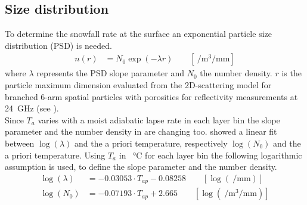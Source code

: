 \subsection{Size distribution} \label{sec:size_dist}
To determine the snowfall rate at the surface an exponential particle size distribution (PSD) is needed. 
\begin{align}
n(r) & = N_{0} \exp\left(-\lambda r\right) \qquad [ \SI{}{\per\cubic\metre\per\mm} ] \label{eq:num_dens}
\end{align}
where $\lambda$ represents the PSD slope parameter and $N_{0}$ the number density. $r$ is the particle maximum dimension evaluated from the 2D-scattering model for branched 6-arm spatial particles with porosities for reflectivity measurements at \SI{24}{\giga\Hz} (see ).
\\
Since $T_{a}$ varies with a moist adiabatic lapse rate in each layer bin the slope parameter and the number density in  are changing too. \cite{wood_estimation_2011} showed a linear fit between $\log(\lambda)$ and the a priori temperature, respectively $\log(N_0)$ and the a priori temperature.
Using $T_{a}$ in \SI{}{\celsius} for each layer bin the following logarithmic assumption is used, to define the slope parameter and the number density.
\begin{align}
\log(\lambda) & = -0.03053 \cdot T_{ap} - 0.08258  \label{eq:lambda} \qquad [ \log(\SI{}{\per\mm}) ]\\
\log(N_0) & = -0.07193 \cdot T_{ap} +2.665  \qquad [ \log(\SI{}{\per\cubic\metre\per\mm})]
\label{eq:N0}
\end{align}
